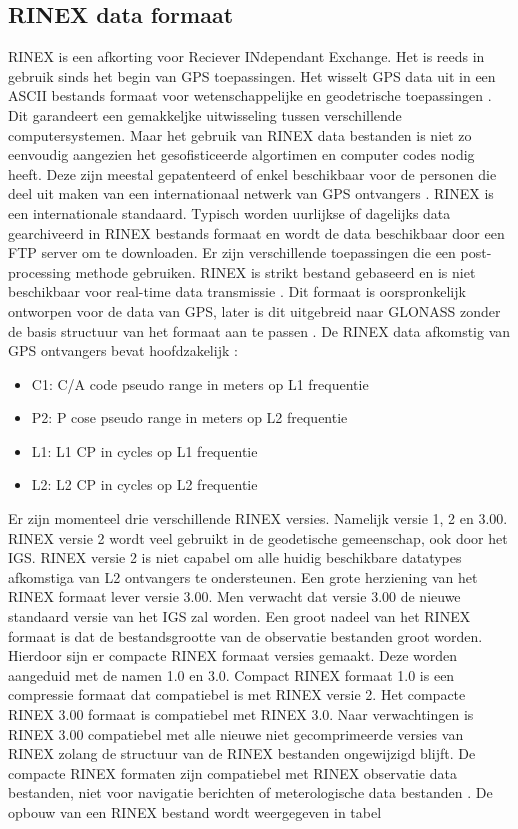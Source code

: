 \subsection{RINEX data formaat}
\label{LRin}
RINEX is een afkorting voor Reciever INdependant Exchange. Het is reeds in gebruik sinds het begin van GPS toepassingen. Het wisselt GPS data uit in een ASCII bestands formaat voor wetenschappelijke en geodetrische toepassingen \cite{LBibRTCM}. Dit garandeert een gemakkeljke uitwisseling tussen verschillende computersystemen. Maar het gebruik van RINEX data bestanden is niet zo eenvoudig aangezien het gesofisticeerde algortimen en computer codes nodig heeft. Deze zijn meestal gepatenteerd of enkel beschikbaar voor de personen die deel uit maken van een internationaal netwerk van GPS ontvangers \cite{LBibGPS5}. RINEX is een internationale standaard. Typisch worden uurlijkse of dagelijks data gearchiveerd in RINEX bestands formaat en wordt de data beschikbaar door een FTP server om te downloaden. Er zijn verschillende toepassingen die een post-processing methode gebruiken. RINEX is strikt bestand gebaseerd en is niet beschikbaar voor real-time data transmissie \cite{LBibRTCM}. Dit formaat is oorspronkelijk ontworpen voor de data van GPS, later is dit uitgebreid naar GLONASS zonder de basis structuur van het formaat aan te passen \cite{LBibRINEX}. De RINEX data afkomstig van GPS ontvangers bevat hoofdzakelijk \cite{LBibGPS5}:
\begin{itemize}
	\item C1: C/A code pseudo range in meters op L1 frequentie
	\item P2: P cose pseudo range in meters op L2 frequentie
	\item L1: L1 CP in cycles op L1 frequentie
	\item L2: L2 CP in cycles op L2 frequentie
\end{itemize}
 Er zijn momenteel drie verschillende RINEX versies. Namelijk versie 1, 2 en 3.00. RINEX versie  2 wordt veel gebruikt in de geodetische gemeenschap, ook door het IGS. RINEX versie 2 is niet capabel om alle huidig beschikbare datatypes afkomstiga van L2 ontvangers te ondersteunen. Een grote herziening van het RINEX formaat lever versie 3.00. Men verwacht dat versie 3.00 de nieuwe standaard versie van het IGS zal worden. Een groot nadeel van het RINEX formaat is dat de bestandsgrootte van de observatie bestanden groot worden. Hierdoor sijn er compacte RINEX formaat versies gemaakt. Deze worden aangeduid met de namen 1.0 en 3.0. Compact RINEX formaat 1.0 is een compressie formaat dat compatiebel is met RINEX versie 2. Het compacte RINEX 3.00 formaat is compatiebel met RINEX 3.0. Naar verwachtingen is RINEX 3.00 compatiebel met alle nieuwe niet gecomprimeerde versies van RINEX zolang de structuur van de RINEX bestanden ongewijzigd blijft.  De compacte RINEX formaten zijn compatiebel met RINEX observatie data bestanden, niet voor navigatie berichten of meterologische data bestanden \cite{LBibRINEX}. De opbouw van een RINEX bestand wordt weergegeven in tabel
